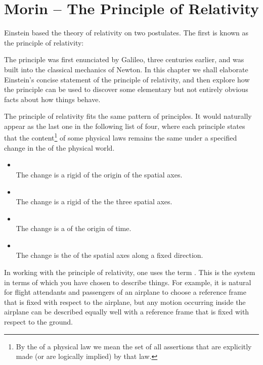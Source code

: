 \chapter{Morin -- The Principle of Relativity}
\label{ch:Morin_01}
Einstein based the theory of relativity on two postulates. 
The first is known as the principle of relativity:\\

The principle was first enunciated by Galileo, three centuries earlier, and was built into the classical mechanics of Newton. In this chapter we shall elaborate Einstein's concise statement of the principle of relativity, and then explore how the principle can be used to discover some elementary but not entirely obvious facts about how things behave. 

The principle of relativity fits the same pattern of  principles. It would naturally appear as the last one in the following list of four, where each principle states that the content\footnote{By the  of a physical law we mean the set of all assertions that are explicitly made (or are logically implied) by that law.} of some physical laws remains the same under a specified change in the  of the physical world.  

\begin{itemize}[noitemsep,topsep=0pt]
\item {}\\
The change is a rigid  of the origin of the spatial axes.
\item {}\\
The change is a rigid  of the the three spatial axes.
\item {}\\
The change is a  of the origin of time.
\item {}\\
The change is the  of the spatial axes along a fixed direction.
\end{itemize}

In working with the principle of relativity, one uses the term . This is the system in terms of which you have chosen to describe things. For example, it is natural for flight attendants and passengers of an airplane to choose a reference frame that is fixed with respect to the airplane, but any motion occurring inside the airplane can be described equally well with a reference frame that is fixed with respect to the ground. 

